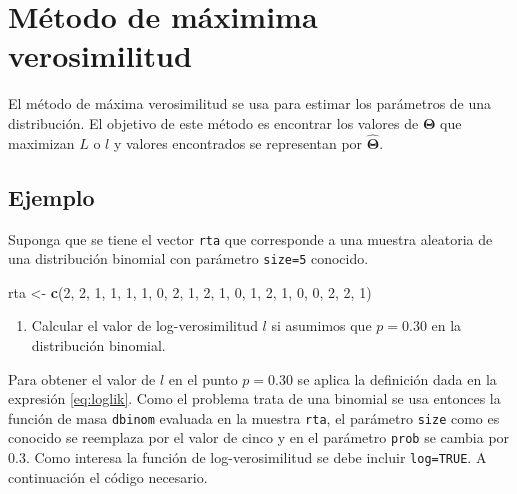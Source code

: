 \documentclass[10pt,]{krantz}
\makeatletter
\newenvironment{Shaded}{\begin{snugshade}}{\end{snugshade}}
\newcommand{\KeywordTok}[1]{\textcolor[rgb]{0.13,0.29,0.53}{\textbf{{#1}}}}
\newcommand{\DecValTok}[1]{\textcolor[rgb]{0.00,0.00,0.81}{{#1}}}
\newcommand{\StringTok}[1]{\textcolor[rgb]{0.31,0.60,0.02}{{#1}}}
\newcommand{\NormalTok}[1]{{#1}}
\providecommand{\tightlist}{%
  \setlength{\itemsep}{0pt}\setlength{\parskip}{0pt}}
\newenvironment{kframe}{%
\medskip{}
\setlength{\fboxsep}{.8em}
 \def\at@end@of@kframe{}%
 \ifinner\ifhmode%
  \def\at@end@of@kframe{\end{minipage}}%
  \begin{minipage}{\columnwidth}%
 \fi\fi%
 \def\FrameCommand##1{\hskip\@totalleftmargin \hskip-\fboxsep
 \colorbox{shadecolor}{##1}\hskip-\fboxsep
     \hskip-\linewidth \hskip-\@totalleftmargin \hskip\columnwidth}%
 \MakeFramed {\advance\hsize-\width
   \@totalleftmargin\z@ \linewidth\hsize
   \@setminipage}}%
 {\par\unskip\endMakeFramed%
 \at@end@of@kframe}
\renewenvironment{Shaded}{\begin{kframe}}{\end{kframe}}
\makeatother
\begin{document}
\section{Método de máximima
verosimilitud}\label{metodo-de-maximima-verosimilitud}

El método de máxima verosimilitud se usa para estimar los parámetros de
una distribución. El objetivo de este método es encontrar los valores de
\(\boldsymbol{\Theta}\) que maximizan \(L\) o \(l\) y valores
encontrados se representan por \(\hat{\boldsymbol{\Theta}}\).

\subsection*{Ejemplo}\label{ejemplo-49}


Suponga que se tiene el vector \texttt{rta} que corresponde a una
muestra aleatoria de una distribución binomial con parámetro
\texttt{size=5} conocido.

\begin{Shaded}
\begin{Highlighting}[]
\NormalTok{rta <-}\StringTok{ }\KeywordTok{c}\NormalTok{(}\DecValTok{2}\NormalTok{, }\DecValTok{2}\NormalTok{, }\DecValTok{1}\NormalTok{, }\DecValTok{1}\NormalTok{, }\DecValTok{1}\NormalTok{, }\DecValTok{1}\NormalTok{, }\DecValTok{0}\NormalTok{, }\DecValTok{2}\NormalTok{, }\DecValTok{1}\NormalTok{, }\DecValTok{2}\NormalTok{, }\DecValTok{1}\NormalTok{, }\DecValTok{0}\NormalTok{, }\DecValTok{1}\NormalTok{, }\DecValTok{2}\NormalTok{, }\DecValTok{1}\NormalTok{, }\DecValTok{0}\NormalTok{, }\DecValTok{0}\NormalTok{, }\DecValTok{2}\NormalTok{, }\DecValTok{2}\NormalTok{, }\DecValTok{1}\NormalTok{)}
\end{Highlighting}
\end{Shaded}

\begin{enumerate}
\def\labelenumi{\arabic{enumi})}
\tightlist
\item
  Calcular el valor de log-verosimilitud \(l\) si asumimos que
  \(p=0.30\) en la distribución binomial.
\end{enumerate}

Para obtener el valor de \(l\) en el punto \(p=0.30\) se aplica la
definición dada en la expresión \eqref{eq:loglik}. Como el problema trata
de una binomial se usa entonces la función de masa \texttt{dbinom}
evaluada en la muestra \texttt{rta}, el parámetro \texttt{size} como es
conocido se reemplaza por el valor de cinco y en el parámetro
\texttt{prob} se cambia por 0.3. Como interesa la función de
log-verosimilitud se debe incluir \texttt{log=TRUE}. A continuación el
código necesario.
\end{document}
